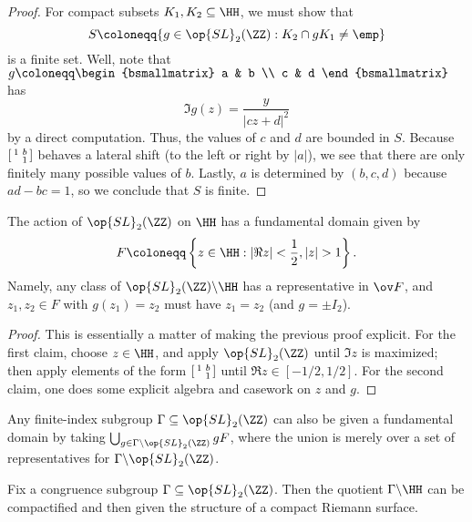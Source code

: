 \documentclass{article}
\begin{document}
\begin{proof}
	For compact subsets $K_1,K_2\subseteq\HH$, we must show that
	\[S\coloneqq\{g\in\op{SL}_2(\ZZ):K_2\cap gK_1\ne\emp\}\]
	is a finite set. Well, note that $g\coloneqq\begin{bsmallmatrix}
		a & b \\ c & d
	\end{bsmallmatrix}$ has
	\[\Im g(z)=\frac y{\left|cz+d\right|^2}\]
	by a direct computation. Thus, the values of $c$ and $d$ are bounded in $S$. Because $\begin{bsmallmatrix}
		1 & b \\ & 1
	\end{bsmallmatrix}$ behaves a lateral shift (to the left or right by $\left|a\right|$), we see that there are only finitely many possible values of $b$. Lastly, $a$ is determined by $(b,c,d)$ because $ad-bc=1$, so we conclude that $S$ is finite.
\end{proof}
\begin{proposition}
	The action of $\op{SL}_2(\ZZ)$ on $\HH$ has a fundamental domain given by
	\[F\coloneqq\left\{z\in\HH:\left|\Re z\right|<\frac12,\left|z\right|>1\right\}.\]
	Namely, any class of $\op{SL}_2(\ZZ)\backslash\HH$ has a representative in $\ov F$, and $z_1,z_2\in F$ with $g(z_1)=z_2$ must have $z_1=z_2$ (and $g=\pm I_2$).
\end{proposition}
\begin{proof}
	This is essentially a matter of making the previous proof explicit. For the first claim, choose $z\in\HH$, and apply $\op{SL}_2(\ZZ)$ until $\Im z$ is maximized; then apply elements of the form $\begin{bsmallmatrix}
		1 & b \\ & 1
	\end{bsmallmatrix}$ until $\Re z\in[-1/2,1/2]$. For the second claim, one does some explicit algebra and casework on $z$ and $g$.
\end{proof}
\begin{remark}
	Any finite-index subgroup $\Gamma\subseteq\op{SL}_2(\ZZ)$ can also be given a fundamental domain by taking $\bigcup_{g\in\Gamma\backslash\op{SL}_2(\ZZ)}gF$, where the union is merely over a set of representatives for $\Gamma\backslash\op{SL}_2(\ZZ)$.
\end{remark}
\begin{proposition}
	Fix a congruence subgroup $\Gamma\subseteq\op{SL}_2(\ZZ)$. Then the quotient $\Gamma\backslash\HH$ can be compactified and then given the structure of a compact Riemann surface.
\end{proposition}
\end{document}
